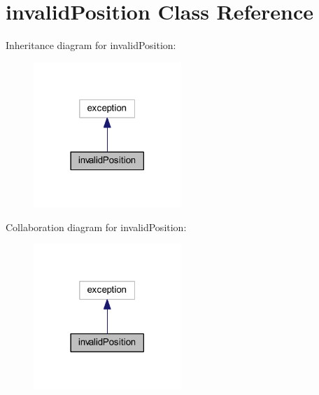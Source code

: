 \hypertarget{classinvalid_position}{\section{invalid\+Position Class Reference}
\label{classinvalid_position}
}


Inheritance diagram for invalid\+Position\+:\nopagebreak
\begin{figure}[H]
\begin{center}
\leavevmode
\includegraphics[width=158pt]{classinvalid_position__inherit__graph}
\end{center}
\end{figure}


Collaboration diagram for invalid\+Position\+:\nopagebreak
\begin{figure}[H]
\begin{center}
\leavevmode
\includegraphics[width=158pt]{classinvalid_position__coll__graph}
\end{center}
\end{figure}
